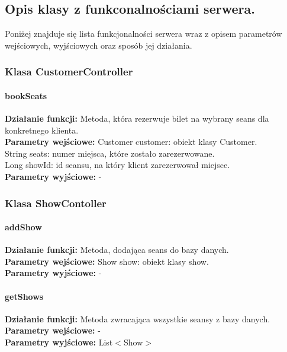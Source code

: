 \documentclass[a4paper,12pt]{article}
\begin{document}
\subsection{Opis klasy z funkconalnościami serwera.}
Poniżej znajduje się lista funkcjonalności serwera wraz z opisem parametrów wejściowych, wyjściowych oraz
sposób jej działania.
\subsubsection{Klasa CustomerController}
\paragraph{bookSeats}

\textbf{Działanie funkcji:} Metoda, która rezerwuje bilet na wybrany seans dla konkretnego klienta.\\
\textbf{Parametry wejściowe:} Customer customer: obiekt klasy Customer. \\
				 String seats: numer miejsca, które zostało zarezerwowane.\\
				Long showId: id seansu, na który klient zarezerwował miejsce.\\
\textbf{Parametry wyjściowe:} -  \\


\subsubsection{Klasa ShowContoller}
\paragraph{addShow}

\textbf{Działanie funkcji:} Metoda, dodająca seans do bazy danych.\\
\textbf{Parametry wejściowe:} Show show: obiekt klasy show. \\
\textbf{Parametry wyjściowe:} -  \\

\paragraph{getShows}

\textbf{Działanie funkcji:} Metoda zwracająca wszystkie seansy z bazy danych.\\
\textbf{Parametry wejściowe:} - \\
\textbf{Parametry wyjściowe:} List$<$Show$>$  \\
\end{document}
